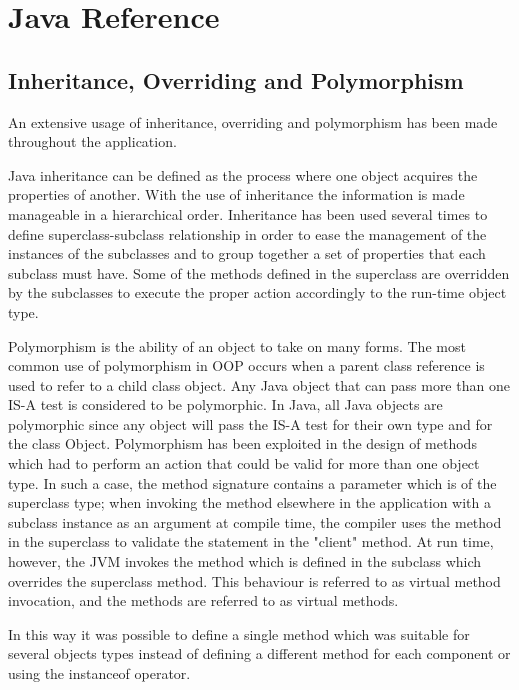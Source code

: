 %
%
\chapter{Java Reference}
\label{ch:reference}

\section{Inheritance, Overriding and Polymorphism}
An extensive usage of inheritance, overriding and polymorphism has been made throughout the application.

\medskip
Java inheritance can be defined as the process where one object acquires the properties of another. With the use of inheritance the information is made manageable in a hierarchical order. Inheritance has been used several times to define superclass-subclass relationship in order to ease the management of the instances of the subclasses and to group together a set of properties that each subclass must have. Some of the methods defined in the superclass are overridden by the subclasses to execute the proper action accordingly to the run-time object type.

Polymorphism is the ability of an object to take on many forms. The most common use of polymorphism in OOP occurs when a parent class reference is used to refer to a child class object. Any Java object that can pass more than one IS-A test is considered to be polymorphic. In Java, all Java objects are polymorphic since any object will pass the IS-A test for their own type and for the class Object.
Polymorphism has been exploited in the design of methods which had to perform an action that could be valid for more than one object type. In such a case, the method signature contains a parameter which is of the superclass type; when invoking the method elsewhere in the application with a subclass instance as an argument at compile time, the compiler uses the method in the superclass to validate the statement in the "client" method. At run time, however, the JVM invokes the method which is defined in the subclass which overrides the superclass method. This behaviour is referred to as virtual method invocation, and the methods are referred to as virtual methods.

\medskip
In this way it was possible to define a single method which was suitable for several objects types instead of defining a different method for each component or using the instanceof operator.

